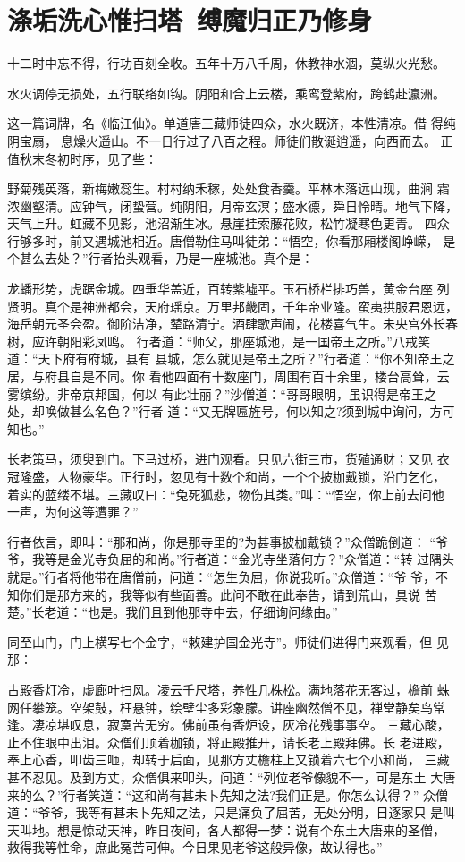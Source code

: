 \chapter{涤垢洗心惟扫塔~缚魔归正乃修身}

十二时中忘不得，行功百刻全收。五年十万八千周，休教神水涸，莫纵火光愁。

水火调停无损处，五行联络如钩。阴阳和合上云楼，乘鸾登紫府，跨鹤赴瀛洲。

这一篇词牌，名《临江仙》。单道唐三藏师徒四众，水火既济，本性清凉。借
得纯阴宝扇，息燥火遥山。不一日行过了八百之程。师徒们散诞逍遥，向西而去。
正值秋末冬初时序，见了些：

野菊残英落，新梅嫩蕊生。村村纳禾稼，处处食香羹。平林木落远山现，曲涧
霜浓幽壑清。应钟气，闭蛰营。纯阴阳，月帝玄溟；盛水德，舜日怜晴。地气下降，
天气上升。虹藏不见影，池沼渐生冰。悬崖挂索藤花败，松竹凝寒色更青。
四众行够多时，前又遇城池相近。唐僧勒住马叫徒弟：“悟空，你看那厢楼阁峥嵘，
是个甚么去处？”行者抬头观看，乃是一座城池。真个是：

龙蟠形势，虎踞金城。四垂华盖近，百转紫墟平。玉石桥栏排巧兽，黄金台座
列贤明。真个是神洲都会，天府瑶京。万里邦畿固，千年帝业隆。蛮夷拱服君恩远，
海岳朝元圣会盈。御阶洁净，辇路清宁。酒肆歌声闹，花楼喜气生。未央宫外长春
树，应许朝阳彩凤鸣。
行者道：“师父，那座城池，是一国帝王之所。”八戒笑道：“天下府有府城，县有
县城，怎么就见是帝王之所？”行者道：“你不知帝王之居，与府县自是不同。你
看他四面有十数座门，周围有百十余里，楼台高耸，云雾缤纷。非帝京邦国，何以
有此壮丽？”沙僧道：“哥哥眼明，虽识得是帝王之处，却唤做甚么名色？”行者
道：“又无牌匾旌号，何以知之?须到城中询问，方可知也。”

长老策马，须臾到门。下马过桥，进门观看。只见六街三市，货殖通财；又见
衣冠隆盛，人物豪华。正行时，忽见有十数个和尚，一个个披枷戴锁，沿门乞化，
着实的蓝缕不堪。三藏叹曰：“兔死狐悲，物伤其类。”叫：“悟空，你上前去问他
一声，为何这等遭罪？”

行者依言，即叫：“那和尚，你是那寺里的?为甚事披枷戴锁？”众僧跪倒道：
“爷爷，我等是金光寺负屈的和尚。”行者道：“金光寺坐落何方？”众僧道：“转
过隅头就是。”行者将他带在唐僧前，问道：“怎生负屈，你说我听。”众僧道：“爷
爷，不知你们是那方来的，我等似有些面善。此问不敢在此奉告，请到荒山，具说
苦楚。”长老道：“也是。我们且到他那寺中去，仔细询问缘由。”

同至山门，门上横写七个金字，“敕建护国金光寺”。师徒们进得门来观看，但
见那：

古殿香灯冷，虚廊叶扫风。凌云千尺塔，养性几株松。满地落花无客过，檐前
蛛网任攀笼。空架鼓，枉悬钟，绘壁尘多彩象朦。讲座幽然僧不见，禅堂静矣鸟常
逢。凄凉堪叹息，寂寞苦无穷。佛前虽有香炉设，灰冷花残事事空。
三藏心酸，止不住眼中出泪。众僧们顶着枷锁，将正殿推开，请长老上殿拜佛。长
老进殿，奉上心香，叩齿三咂，却转于后面，见那方丈檐柱上又锁着六七个小和尚，
三藏甚不忍见。及到方丈，众僧俱来叩头，问道：“列位老爷像貌不一，可是东土
大唐来的么？”行者笑道：“这和尚有甚未卜先知之法?我们正是。你怎么认得？”
众僧道：“爷爷，我等有甚未卜先知之法，只是痛负了屈苦，无处分明，日逐家只
是叫天叫地。想是惊动天神，昨日夜间，各人都得一梦：说有个东土大唐来的圣僧，
救得我等性命，庶此冤苦可伸。今日果见老爷这般异像，故认得也。”

